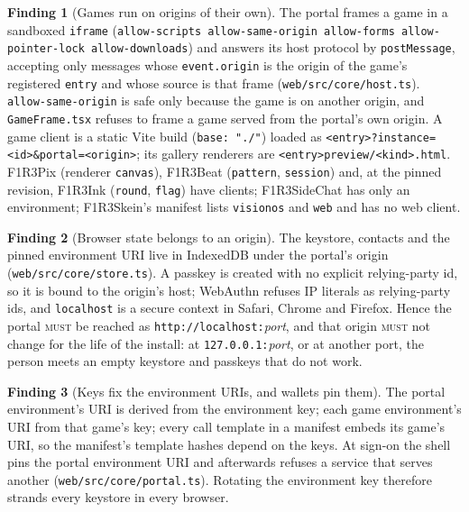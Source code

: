 \documentclass[11pt]{article}
\theoremstyle{definition}
\newtheorem{finding}{Finding}
\theoremstyle{remark}
\newcommand{\MUST}{\textsc{must}}
\newcommand{\code}[1]{\texttt{#1}}
\begin{document}
\begin{finding}[Games run on origins of their own]\label{f:origins}
The portal frames a game in a sandboxed \code{iframe}
(\code{allow-scripts allow-same-origin allow-forms allow-pointer-lock
allow-downloads}) and answers its host protocol by \code{postMessage}, accepting
only messages whose \code{event.origin} is the origin of the game's registered
\code{entry} and whose source is that frame (\code{web/src/core/host.ts}).
\code{allow-same-origin} is safe only because the game is on another origin, and
\code{GameFrame.tsx} refuses to frame a game served from the portal's own origin.
A game client is a static Vite build (\code{base: "./"}) loaded as
\code{<entry>?instance=<id>\&portal=<origin>}; its gallery renderers are
\code{<entry>preview/<kind>.html}. F1R3Pix (renderer \code{canvas}), F1R3Beat
(\code{pattern}, \code{session}) and, at the pinned revision, F1R3Ink (\code{round},
\code{flag}) have clients; F1R3SideChat has only an environment; F1R3Skein's manifest
lists \code{visionos} and \code{web} and has no web client.
\end{finding}

\begin{finding}[Browser state belongs to an origin]\label{f:browserstate}
The keystore, contacts and the pinned environment URI live in IndexedDB under the
portal's origin (\code{web/src/core/store.ts}). A passkey is created with no explicit
relying-party id, so it is bound to the origin's host; WebAuthn refuses IP literals
as relying-party ids, and \code{localhost} is a secure context in Safari, Chrome and
Firefox. Hence the portal \MUST{} be reached as \code{http://localhost:}\textit{port},
and that origin \MUST{} not change for the life of the install: at
\code{127.0.0.1:}\textit{port}, or at another port, the person meets an empty
keystore and passkeys that do not work.
\end{finding}

\begin{finding}[Keys fix the environment URIs, and wallets pin them]\label{f:pin}
The portal environment's URI is derived from the environment key; each game
environment's URI from that game's key; every call template in a manifest embeds its
game's URI, so the manifest's template hashes depend on the keys. At sign-on the
shell pins the portal environment URI and afterwards refuses a service that serves
another (\code{web/src/core/portal.ts}). Rotating the environment key therefore
strands every keystore in every browser.
\end{finding}
\end{document}
